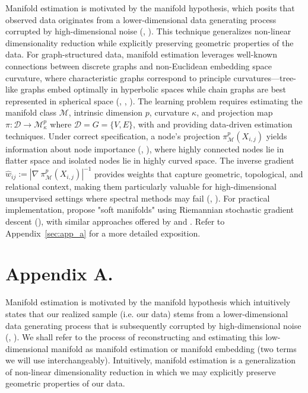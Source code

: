 \documentclass[twoside,11pt]{article}
\begin{document}
Manifold estimation is motivated by the manifold hypothesis, which posits that observed data originates from a lower-dimensional data generating process corrupted by high-dimensional noise (\citet{fefferman_etal_2013}, \citet{meng_eloyan_2021}). This technique generalizes non-linear dimensionality reduction while explicitly preserving geometric properties of the data. For graph-structured data, manifold estimation leverages well-known connections between discrete graphs and non-Euclidean embedding space curvature, where characteristic graphs correspond to principle curvatures—tree-like graphs embed optimally in hyperbolic spaces while chain graphs are best represented in spherical space (\citet{bronstein_etal_2017}, \citet{weber_2018}, \citet{weber_2020}). The learning problem requires estimating the manifold class $\mathcal{M}$, intrinsic dimension $p$, curvature $\kappa$, and projection map $\pi: \mathcal{D} \rightarrow \mathcal{M}_\kappa^p$ where $\mathcal{D} = G = \{V,E\}$, with \citet{lubold_etal_2022} and \citet{meng_eloyan_2021} providing data-driven estimation techniques. Under correct specification, a node's projection $\pi_\mathcal{M}^p(X_{i,j})$ yields information about node importance (\citet{yamada_2025}, \citet{xu_2020}), where highly connected nodes lie in flatter space and isolated nodes lie in highly curved space. The inverse gradient $\hat{w}_{ij} := |\nabla~\pi_\mathcal{M}^p(X_{i,j})|^{-1}$ provides weights that capture geometric, topological, and relational context, making them particularly valuable for high-dimensional unsupervised settings where spectral methods may fail (\citet{baptista_etal_2023}, \citet{rubin-delanchy_2021}). For practical implementation, \citet{digiovanni_etal_2022} propose "soft manifolds" using Riemannian stochastic gradient descent (\citet{bonnabel_2013}), with similar approaches offered by \citet{marinoni_etal_2023} and \citet{jyothish_jannesari_2025}. Refer to Appendix~\ref{sec:app_a} for a more detailed exposition. 

\newpage

\appendix
\section*{Appendix A.} \label{sec:app_a}

Manifold estimation is motivated by the manifold hypothesis \citep{fefferman_etal_2013} which intuitively states that our realized sample (i.e. our data) stems from a lower-dimensional data generating process that is subsequently corrupted by high-dimensional noise (\citet{fefferman_etal_2013}, \citet{meng_eloyan_2021}). We shall refer to the process of reconstructing and estimating this low-dimensional manifold as manifold estimation or manifold embedding (two terms we will use interchangeably). Intuitively, manifold estimation is a generalization of non-linear dimensionality reduction in which we may explicitly preserve geometric properties of our data.  
\end{document}
